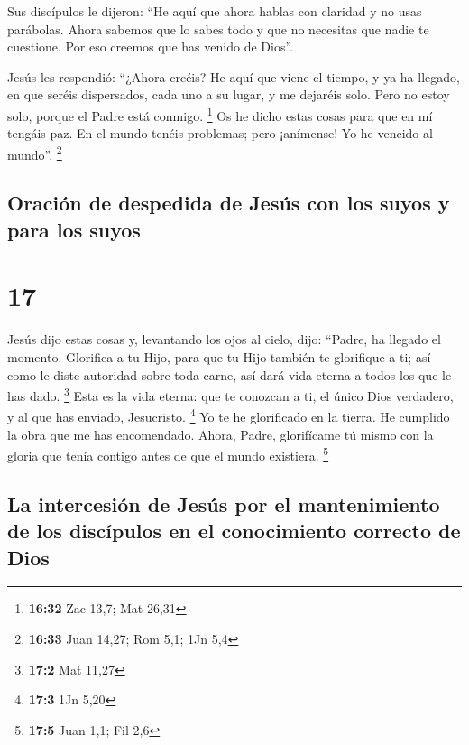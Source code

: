  Sus discípulos le dijeron: ``He aquí que ahora hablas
con claridad y no usas parábolas.  Ahora sabemos que lo
sabes todo y que no necesitas que nadie te cuestione. Por eso creemos
que has venido de Dios''.

 Jesús les respondió: ``¿Ahora creéis?  He
aquí que viene el tiempo, y ya ha llegado, en que seréis dispersados,
cada uno a su lugar, y me dejaréis solo. Pero no estoy solo, porque el
Padre está conmigo. \footnote{\textbf{16:32} Zac 13,7; Mat 26,31}
 Os he dicho estas cosas para que en mí tengáis paz. En
el mundo tenéis problemas; pero ¡anímense! Yo he vencido al mundo''.
\footnote{\textbf{16:33} Juan 14,27; Rom 5,1; 1Jn 5,4}

\hypertarget{oraciuxf3n-de-despedida-de-jesuxfas-con-los-suyos-y-para-los-suyos}{%
\subsection{Oración de despedida de Jesús con los suyos y para los
suyos}\label{oraciuxf3n-de-despedida-de-jesuxfas-con-los-suyos-y-para-los-suyos}}

\hypertarget{section-16}{%
\section{17}\label{section-16}}

 Jesús dijo estas cosas y, levantando los ojos al cielo,
dijo: ``Padre, ha llegado el momento. Glorifica a tu Hijo, para que tu
Hijo también te glorifique a ti;  así como le diste
autoridad sobre toda carne, así dará vida eterna a todos los que le has
dado. \footnote{\textbf{17:2} Mat 11,27}  Esta es la vida
eterna: que te conozcan a ti, el único Dios verdadero, y al que has
enviado, Jesucristo. \footnote{\textbf{17:3} 1Jn 5,20}  Yo
te he glorificado en la tierra. He cumplido la obra que me has
encomendado.  Ahora, Padre, glorifícame tú mismo con la
gloria que tenía contigo antes de que el mundo existiera. \footnote{\textbf{17:5}
  Juan 1,1; Fil 2,6}

\hypertarget{la-intercesiuxf3n-de-jesuxfas-por-el-mantenimiento-de-los-discuxedpulos-en-el-conocimiento-correcto-de-dios}{%
\subsection{La intercesión de Jesús por el mantenimiento de los
discípulos en el conocimiento correcto de
Dios}\label{la-intercesiuxf3n-de-jesuxfas-por-el-mantenimiento-de-los-discuxedpulos-en-el-conocimiento-correcto-de-dios}}


